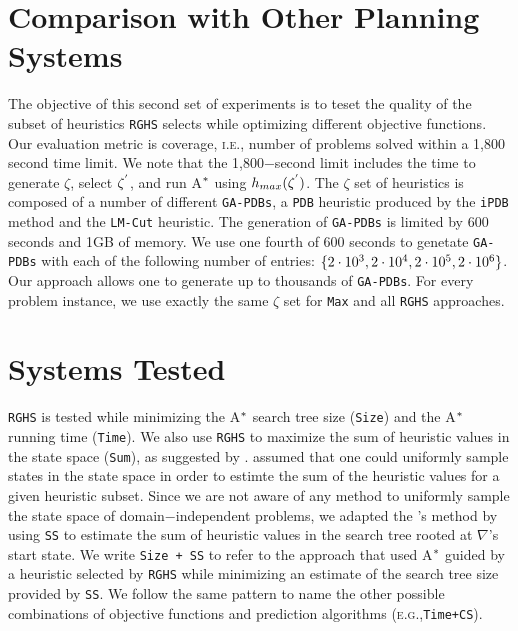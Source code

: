 \section{Comparison with Other Planning Systems}
\noindent
The objective of this second set of experiments is to teset the quality of the subset of heuristics \texttt{RGHS} selects while optimizing different objective functions. Our evaluation metric is coverage, \textsc{i.e.,} number of problems solved within a 1,800 second time limit. We note that the 1,800$-$second limit includes the time to generate $\zeta$, select $\zeta\sp{'}$, and run A$\sp{*}$ using $h_{max}(\zeta\sp{'})$. The $\zeta$ set of heuristics is composed of a number of different \texttt{GA-PDBs}, a \texttt{PDB} heuristic produced by the \texttt{iPDB} method \cite{haslum2007domain} and the \texttt{LM-Cut} heuristic. The generation of \texttt{GA-PDBs} is limited by 600 seconds and 1GB of memory. We use one fourth of 600 seconds to genetate \texttt{GA-PDBs} with each of the following number of entries: $\{2 \cdot 10\sp{3}, 2 \cdot 10\sp{4}, 2 \cdot 10\sp{5}, 2 \cdot 10\sp{6}\}$. Our approach allows one to generate up to thousands of \texttt{GA-PDBs}. For every problem instance, we use exactly the same $\zeta$ set for \texttt{Max} and all \texttt{RGHS} approaches.\\

\section{Systems Tested}
\noindent
\texttt{RGHS} is tested while minimizing the A$\sp{*}$ search tree size (\texttt{Size}) and the A$\sp{*}$ running time (\texttt{Time}). We also use \texttt{RGHS} to maximize the sum of heuristic values in the state space (\texttt{Sum}), as suggested by \cite{raynersss13}. \cite{raynersss13} assumed that one could uniformly sample states in the state space in order to estimte the sum of the heuristic values for a given heuristic subset. Since we are not aware of any method to uniformly sample the state space of domain$-$independent problems, we adapted the \cite{raynersss13}'s method by using \texttt{SS} to estimate the sum of heuristic values in the search tree rooted at $\nabla$'s start state. We write \texttt{Size + SS} to refer to the approach that used A$\sp{*}$ guided by a heuristic selected by \texttt{RGHS} while minimizing an estimate of the search tree size provided by \texttt{SS}. We follow the same pattern to name the other possible combinations of objective functions and prediction algorithms (\textsc{e.g.,}\texttt{Time+CS}).\\

